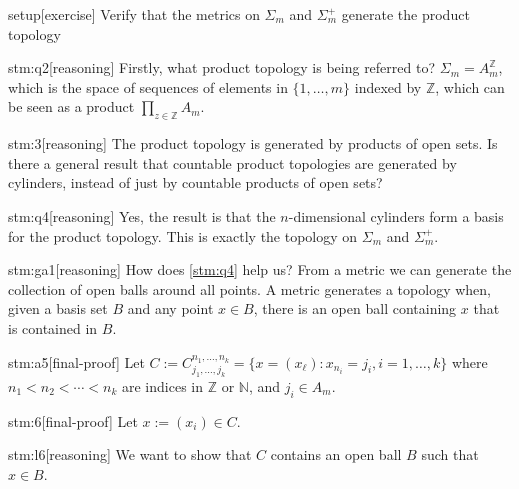 \documentclass{article}
\begin{document}

\begin{stm}{setup}[exercise]
Verify that the metrics on $\Sigma_m$ and $\Sigma_m^+$ generate the product topology
\end{stm}


\begin{stm}{stm:q2}[reasoning]
Firstly, what product topology is being referred to? $\Sigma_m = A_m^{\mathbb{Z}}$, which is the space of sequences of elements in $\{1,\ldots,m\}$ indexed by $\mathbb{Z}$, which can be seen as a product $\prod_{z \in \mathbb{Z}} A_m$.
\end{stm}

\begin{stm}{stm:3}[reasoning]
The product topology is generated by products of open sets. Is there a general result that countable product topologies are generated by cylinders, instead of just by countable products of open sets?
\end{stm}

\begin{stm}{stm:q4}[reasoning]
Yes, the result is that the $n$-dimensional cylinders form a basis for the product topology. This is exactly the topology on $\Sigma_m$ and $\Sigma_m^+$.
\end{stm}

\begin{stm}{stm:ga1}[reasoning]
How does \ref{stm:q4} help us? From a metric we can generate the collection of open balls around all points. A metric generates a topology when, given a basis set $B$ and any point $x \in B$, there is an open ball containing $x$ that is contained in $B$.
\end{stm}

\begin{stm}{stm:a5}[final-proof]
Let $C := C_{j_1,\ldots,j_k}^{n_1,\ldots,n_k} = \{ x = (x_\ell) : x_{n_i} = j_i, i=1,\ldots,k \}$ where $n_1 < n_2 < \cdots < n_k$ are indices in $\mathbb{Z}$ or $\mathbb{N}$, and $j_i \in A_m$.
\end{stm}

\begin{stm}{stm:6}[final-proof]
    Let $x := (x_i)  \in C$.
\end{stm}

\begin{stm}{stm:l6}[reasoning]
We want to show that $C$ contains an open ball $B$ such that $x \in B$.
\end{stm}
\end{document}

